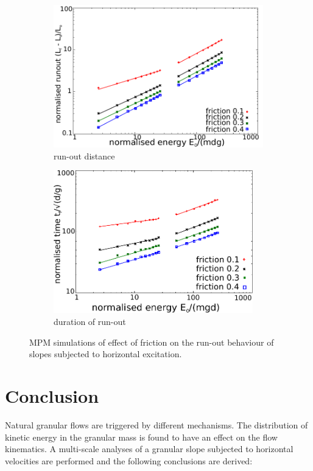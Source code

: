 \documentclass[3p,times,procedia,number]{elsarticle}
\begin{document}
\begin{figure}[tbhp]
  \centering
  \begin{subfigure}[b]{0.4\textwidth}
    \centering
    \includegraphics[width=\textwidth]{figs/runout_fric_slope}
    \caption{run-out distance}
    \label{fig:runout_fric_slope}
  \end{subfigure}
  \begin{subfigure}[b]{0.4\textwidth}
    \centering
    \includegraphics[width=0.95\textwidth]{figs/time_fric_slope}
    \caption{duration of run-out}
    \label{fig:time_fric_slope}
  \end{subfigure}
  \caption{MPM simulations of effect of friction on the run-out behaviour of 
  slopes subjected to horizontal excitation.}
  \label{fig:fric_slope}
\end{figure}

\section{Conclusion}
Natural granular flows are triggered by different mechanisms. The distribution 
of kinetic energy in the granular mass is found to have an effect on the flow 
kinematics. A multi-scale analyses of a granular slope subjected to horizontal 
velocities are performed and the following conclusions are derived:
\end{document}
